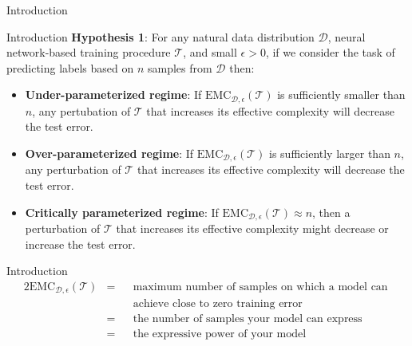 \documentclass[8pt]{beamer}
\begin{document}
	\begin{frame}{Introduction}
		\centering
		\vfill
		\vfill
	\end{frame}

	\begin{frame}{Introduction}
		\textbf{Hypothesis 1}: For any natural data distribution $\mathcal{D}$, neural network-based training procedure $\mathcal{T}$, and small $\epsilon>0$, if we consider the task of predicting labels based on $n$ samples from $\mathcal{D}$ then:
		\begin{itemize}
			\item \textbf{Under-parameterized regime}: If $\mathrm{EMC}_{\mathcal{D},\epsilon}(\mathcal{T})$ is sufficiently smaller than $n$, any pertubation of $\mathcal{T}$ that increases its effective complexity will decrease the test error.
			\item \textbf{Over-parameterized regime}: If $\mathrm{EMC}_{\mathcal{D},\epsilon}(\mathcal{T})$ is sufficiently larger than $n$, any perturbation of $\mathcal{T}$ that increases its effective complexity will decrease the test error.
			\item \textbf{Critically parameterized regime}: If $\mathrm{EMC}_{\mathcal{D},\epsilon}(\mathcal{T}) \approx n$, then a perturbation of $\mathcal{T}$ that increases its effective complexity might decrease or increase the test error.
		\end{itemize}
	\end{frame}

	\begin{frame}{Introduction}
		\begin{alignat*}{2}
			\mathrm{EMC}_{\mathcal{D},\epsilon}(\mathcal{T}) &= &&\textrm{maximum number of samples on which a model can }\\
			& &&\textrm{achieve close to zero training error}\\
			&= &&\textrm{the number of samples your model can express}\\
			&= &&\textrm{the expressive power of your model}\\
		\end{alignat*}
	\end{frame}
\end{document}
